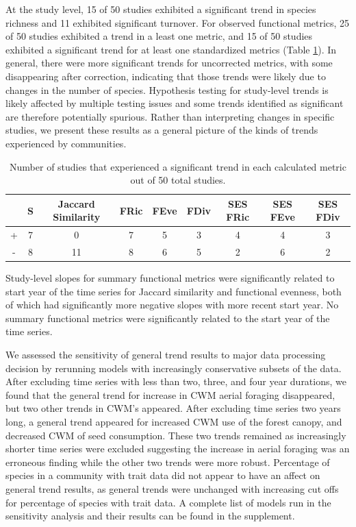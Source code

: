 \documentclass{article}
\begin{document}
At the study level, 15 of 50 studies exhibited a significant trend in
species richness and 11 exhibited significant turnover. For observed
functional metrics, 25 of 50 studies exhibited a trend in a least one
metric, and 15 of 50 studies exhibited a significant trend for at least
one standardized metrics (Table \ref{tab:trendTab}). In general, there
were more significant trends for uncorrected metrics, with some
disappearing after correction, indicating that those trends were likely
due to changes in the number of species. Hypothesis testing for
study-level trends is likely affected by multiple testing issues and
some trends identified as significant are therefore potentially
spurious. Rather than interpreting changes in specific studies, we
present these results as a general picture of the kinds of trends
experienced by communities.

\begin{table}

\caption{\label{tab:trendTab}Number of studies that experienced a significant trend in each calculated metric out of 50 total studies.}
\centering
\begin{tabular}[t]{ccccccccc}
\toprule
 & S & Jaccard Similarity & FRic & FEve & FDiv & SES FRic & SES FEve & SES FDiv\\
\midrule
+ & 7 & 0 & 7 & 5 & 3 & 4 & 4 & 3\\
- & 8 & 11 & 8 & 6 & 5 & 2 & 6 & 2\\
\bottomrule
\end{tabular}
\end{table}

Study-level slopes for summary functional metrics were significantly
related to start year of the time series for Jaccard similarity and
functional evenness, both of which had significantly more negative
slopes with more recent start year. No summary functional metrics were
significantly related to the start year of the time series.

We assessed the sensitivity of general trend results to major data
processing decision by rerunning models with increasingly conservative
subsets of the data. After excluding time series with less than two,
three, and four year durations, we found that the general trend for
increase in CWM aerial foraging disappeared, but two other trends in
CWM's appeared. After excluding time series two years long, a general
trend appeared for increased CWM use of the forest canopy, and decreased
CWM of seed consumption. These two trends remained as increasingly
shorter time series were excluded suggesting the increase in aerial
foraging was an erroneous finding while the other two trends were more
robust. Percentage of species in a community with trait data did not
appear to have an affect on general trend results, as general trends
were unchanged with increasing cut offs for percentage of species with
trait data. A complete list of models run in the sensitivity analysis
and their results can be found in the supplement.
\end{document}
